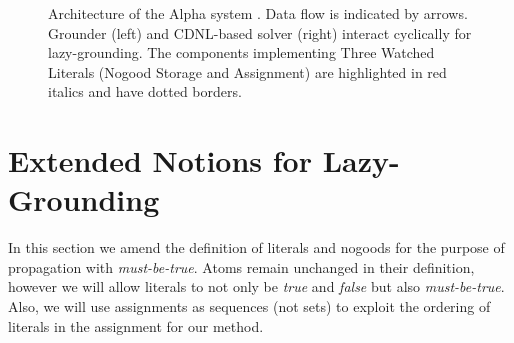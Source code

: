 \documentclass[final]{vutinfth} %
\newtheorem{definition}{Definition}[chapter]
\newcommand{\mbt}{must-be-true\xspace}
\begin{document}
\begin{figure}[t]
\caption[Architecture of the Alpha system]{Architecture of the Alpha system \cite[Figure 1]{alpha-techniques}. Data flow is indicated by arrows. Grounder (left) and CDNL-based solver (right) interact cyclically for lazy-grounding. The components implementing Three Watched Literals (Nogood Storage and Assignment) are highlighted in red italics and have dotted borders.}
  \label{fig:arch}
\end{figure}

\section{Extended Notions for Lazy-Grounding}


In this section we amend the definition of literals and nogoods for the purpose of propagation with \emph{\mbt}. Atoms remain unchanged in their definition, however we will allow literals to not only be \emph{true} and \emph{false} but also \emph{\mbt}. Also, we will use assignments as sequences (not sets) to exploit the ordering of literals in the assignment for our method.



\end{document}
